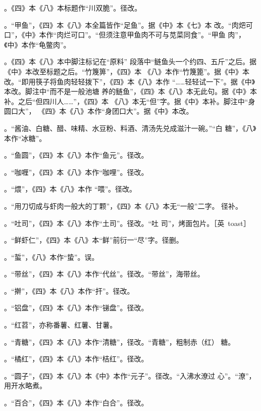 。《四》本《八》本标题作“川双脆”。径改。

。“甲鱼”，《四》本《八》本全篇皆作“足鱼”。据《中》本《七》本
改。“肉𤆵可口”，《中》本作“肉烂可口”。“但须注意甲鱼肉不可与苋菜同食”。“甲鱼
肉”，《中》本作“龟鳖肉”。

。《四》本《八》本中脚注标记{\footnotesize{}}在“原料”
段落中“鲢鱼头一个约四、五斤”之后。据《中》本改至标题之后。“竹篾箅”，《四》本
《八》本作“竹篾篦”。据《中》本改。“即用筷子将鱼肉轻轻拨下”，《四》本《八》本作
“……轻轻试一下”。据《中》本改。脚注{\footnotesize{}}中“而不是一般池塘
养的鲢鱼”，《四》本《八》本无此句。据《中》本补。之后“但四川人……”，《四》本
《八》本无“但”字。据《中》本补。脚注{\footnotesize{}}中“身圆口大”，
《四》本《八》本作“身团口大”。据《中》本改。

。“酱油、白糖、醋、味精、水豆粉、料酒、清汤先兑成滋汁一碗。”“白
糖”，《八》本作“冰糖”。

。“鱼圆”，《四》本《八》本作“鱼元”。径改。

。“咖喱”，《四》本《八》本作“咖哩”。径改。

。“煨”，《四》本《八》本作
“喂”。径改。

。“用刀切成与虾肉一般大的丁颗”，《四》本《八》本无“一般”二字。
径补。

。“吐司”，《四》本《八》本作“土司”。径改。“吐
司”，烤面包片。［英~toast］

。“鲜虾仁”，《四》本《八》本“鲜”前衍一“尽”字。径删。

。“蜇”，《八》本作“蛰”。误。

。“带丝”，《四》本《八》本作“代丝”。径改。“带丝”，海带丝。

。“擀”，《四》本《八》本作“扞”。径改。

。“铝盘”，《四》本《八》本作“锑盘”。径改。

。“红苕”，亦称番薯、红薯、甘薯。

。“青糖”，《四》本《八》本作“清糖”，径改。“青糖”，粗制赤（红）
糖。

。“橘红”，《四》本《八》本作“桔红”。径改。

。“圆子”，《四》本《八》本《中》本作“元子”。径改。“入沸水潦过
心”。“潦”，用开水略煮。

。“百合”，《四》本《八》本作“白合”。径改。

